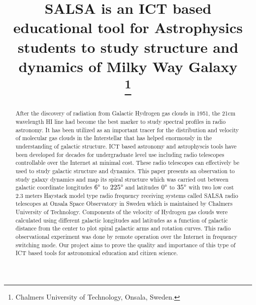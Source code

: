 \documentclass[10pt,conference]{IEEEtran}
\begin{document}
\title{SALSA is an ICT based educational tool for Astrophysics students to study structure and dynamics of Milky Way Galaxy\\
{\footnotesize}
\thanks{Chalmers University of Technology, Onsala, Sweden.}
}

\author{
\and
{}
}

\maketitle

\begin{abstract}
After the discovery of radiation from Galactic Hydrogen gas clouds in 1951, the 21cm wavelength HI line had become the best marker to study spectral profiles in radio astronomy. It has been utilized as an important tracer for the distribution and velocity of molecular gas clouds in the Interstellar that has helped enormously in the understanding of galactic structure. ICT based astronomy and astrophyscis tools have been developed for decades for undergraduate level use including radio telescopes controllable over the Internet at minimal cost. These radio telescopes can effectively be used to study galactic structure and dynamics. This paper presents an observation to study galaxy dynamics and map its spiral structure which was carried out between galactic coordinate longitudes $6\degree$ to $225\degree$ and latitudes $0\degree$ to $35\degree$ with two low cost $2.3$ meters Haystack model type radio frequency receiving systems called SALSA radio telescopes at Onsala Space Observatory in Sweden which is maintained by Chalmers University of Technology. Components of the velocity of Hydrogen gas clouds were calculated using different galactic longitudes and latitudes as a function of galactic distance from the center to plot spiral galactic arms and rotation curves. This radio observational experiment was done by remote operation over the Internet in frequency switching mode. Our project aims to prove the quality and importance of this type of ICT based tools for astronomical education and citizen science.
\end{abstract}
\end{document}
